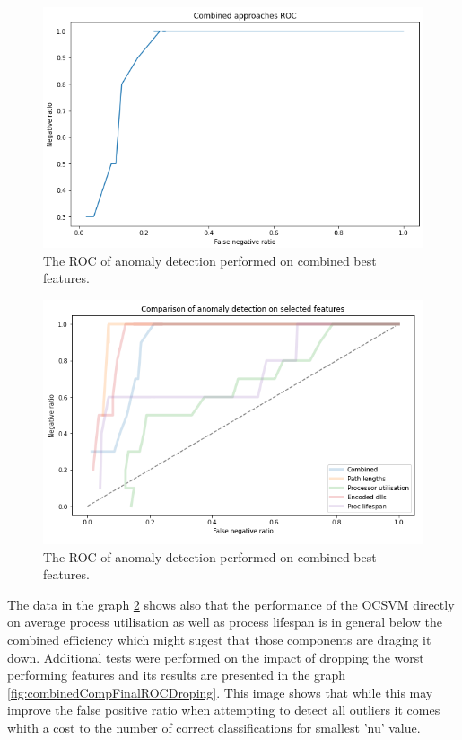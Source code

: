 \documentclass[a4paper,twoside,12pt]{book}
\begin{document}
\begin{figure}
	\centering
	\includegraphics[scale=0.9]{images/CombinedFinalROC}
	\caption{The ROC of anomaly detection performed on combined best features.}
	\label{fig:combinedFinalROC}
 \end{figure}


 \begin{figure}
	\centering
	\includegraphics[scale=0.9]{images/CombinedCompFinalROC}
	\caption{The ROC of anomaly detection performed on combined best features.}
	\label{fig:combinedCompFinalROC}
 \end{figure}

The data in the graph \ref{fig:combinedCompFinalROC} shows also that the performance of the OCSVM directly on average process utilisation
as well as process lifespan is in general below the combined efficiency which might sugest that those components are draging it down. 
Additional tests were performed on the impact of dropping the worst performing features and its results are presented in the graph \ref{fig:combinedCompFinalROCDroping}. 
This image shows that while this may improve the false positive ratio when attempting to detect all outliers it comes whith 
a cost to the number of correct classifications for smallest 'nu' value.
\end{document}
